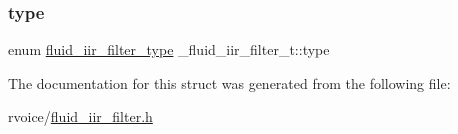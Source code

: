 \mbox{\label{struct__fluid__iir__filter__t_a651ef143533475852e123c05e8b7be1c}} 
\subsubsection{\texorpdfstring{type}{type}}
{\footnotesize\ttfamily enum \hyperlink{synth_8h_a8a4cb4bd240d3654707ac0c5c7337a63}{fluid\+\_\+iir\+\_\+filter\+\_\+type} \+\_\+fluid\+\_\+iir\+\_\+filter\+\_\+t\+::type}



The documentation for this struct was generated from the following file\+:\begin{DoxyCompactItemize}
\item 
rvoice/\hyperlink{fluid__iir__filter_8h}{fluid\+\_\+iir\+\_\+filter.\+h}\end{DoxyCompactItemize}
